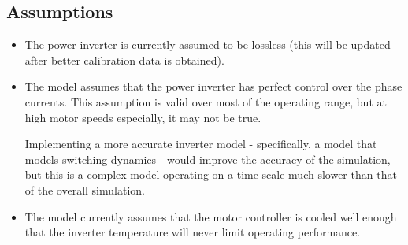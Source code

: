 \documentclass[../SimBALink.tex]{subfiles}
\begin{document}
\subsection{Assumptions}
	\begin{itemize}
		\item 
			The power inverter is currently assumed to be lossless (this will be updated after better calibration data is obtained).
		\item
			The model assumes that the power inverter has perfect control over the phase currents. This assumption is valid over most of the operating range, but at high motor speeds especially, it may not be true. 
			
			Implementing a more accurate inverter model - specifically, a model that models switching dynamics - would improve the accuracy of the simulation, but this is a complex model operating on a time scale much slower than that of the overall simulation.
		\item
			The model currently assumes that the motor controller is cooled well enough that the inverter temperature will never limit operating performance.
			
	\end{itemize}
\end{document}
